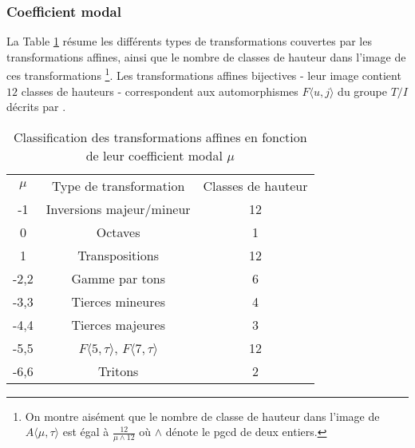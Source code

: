 \subsubsection{Coefficient modal}

La Table \ref{tab:classmu} résume les différents types de transformations couvertes par les transformations affines, ainsi que le nombre de classes de hauteur dans l'image de ces transformations \footnote{On montre aisément que le nombre de classe de hauteur dans l'image de $A\langle \mu, \tau\rangle$ est égal à $\frac{12}{\mu\wedge 12}$ où $\wedge$ dénote le pgcd de deux entiers.}. Les transformations affines bijectives - leur image contient $12$ classes de hauteurs - correspondent  aux automorphismes $F\langle u,j \rangle$ du groupe $T/I$ décrits par \cite{lewin1990klumpenhouwer}.


\begin{table}[h]
  \centering
  \begin{tabular}{ccc}
    \rowcolor{gray!50}
    $\mu$ & Type de transformation & Classes de hauteur\\
    -1 & Inversions majeur/mineur & 12\\
    0 & Octaves & 1\\
    1 & Transpositions & 12 \\
    -2,2 & Gamme par tons & 6 \\
    -3,3 & Tierces mineures &4 \\
    -4,4 & Tierces majeures & 3\\
    -5,5 & $F\langle 5,\tau \rangle$, $F\langle 7,\tau \rangle$& 12 \\
    -6,6 & Tritons & 2\\
  \end{tabular}
  \caption{Classification des transformations affines en fonction de leur coefficient modal $\mu$\label{tab:classmu} } 
\end{table}